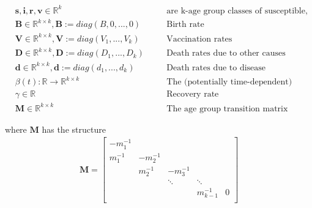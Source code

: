 \documentclass{article}
\theoremstyle{definition}
\begin{document}
\begin{align*}
&\mathbf{s}, \mathbf{i}, \mathbf{r} ,\mathbf{v}\in \mathbb{R}^k& \quad& \text{are k-age group classes of susceptible, infected, recovered}\\
&\mathbf{B} \in \mathbb{R}^{k\times k}, \mathbf{B}:=diag(B,0,...,0)& \quad& \text{Birth rate}\\
&\mathbf{V} \in \mathbb{R}^{k\times k}, \mathbf{V}:=diag(V_1,...,V_k) &\quad& \text{Vaccination rates}\\
&\mathbf{D} \in \mathbb{R}^{k\times k}, \mathbf{D}:=diag(D_1,...,D_k) &\quad& \text{Death rates due to other causes}\\
&\mathbf{d} \in \mathbb{R}^{k\times k}, \mathbf{d}:=diag(d_1,...,d_k) &\quad& \text{Death rates due to disease}\\
&\beta(t):\mathbb{R} \rightarrow \mathbb{R}^{k\times k}&\quad& \text{The (potentially time-dependent) contact rate}\\
&\gamma \in \mathbb{R}&\quad&\text{Recovery rate}\\
&\mathbf{M}\in\mathbb{R}^{k\times k}&\quad& \text{The age group transition matrix}
\end{align*}

  where $\mathbf{M}$ has the structure
\begin{gather*}
\mathbf{M}=\begin{bmatrix}
-m_1^{-1} &      &        &        &    \\
 m_1^{-1} & -m_2^{-1} &        &        &    \\
     &  m_2^{-1} & -m_3^{-1}   &        &    \\
     &      & \ddots & \ddots &    \\
     &      &		 & m_{k-1}^{-1}& 0\\
\end{bmatrix}
\end{gather*}
\end{document}
